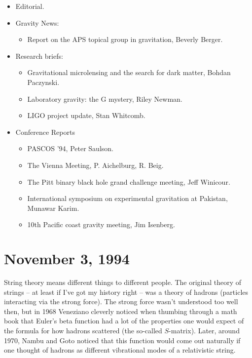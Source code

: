 \documentclass[12pt]{article}
\def\tightlist{}
\begin{document}
\begin{itemize}
\tightlist
\item
  Editorial.
\item
  Gravity News:

  \begin{itemize}
  \tightlist
  \item
    Report on the APS topical group in gravitation, Beverly Berger.
  \end{itemize}
\item
  Research briefs:

  \begin{itemize}
  \tightlist
  \item
    Gravitational microlensing and the search for dark matter, Bohdan
    Paczynski.
  \item
    Laboratory gravity: the G mystery, Riley Newman.
  \item
    LIGO project update, Stan Whitcomb.
  \end{itemize}
\item
  Conference Reports

  \begin{itemize}
  \tightlist
  \item
    PASCOS '94, Peter Saulson.
  \item
    The Vienna Meeting, P. Aichelburg, R. Beig.
  \item
    The Pitt binary black hole grand challenge meeting, Jeff Winicour.
  \item
    International symposium on experimental gravitation at Pakistan,
    Munawar Karim.
  \item
    10th Pacific coast gravity meeting, Jim Isenberg.
  \end{itemize}
\end{itemize}



\hypertarget{week42}{%
\section{November 3, 1994}\label{week42}}

String theory means different things to different people. The original
theory of strings -- at least if I've got my history right -- was a
theory of hadrons (particles interacting via the strong force). The
strong force wasn't understood too well then, but in 1968 Veneziano
cleverly noticed when thumbing through a math book that Euler's beta
function had a lot of the properties one would expect of the formula for
how hadrons scattered (the so-called \(S\)-matrix). Later, around 1970,
Nambu and Goto noticed that this function would come out naturally if
one thought of hadrons as different vibrational modes of a relativistic
string.
\end{document}
